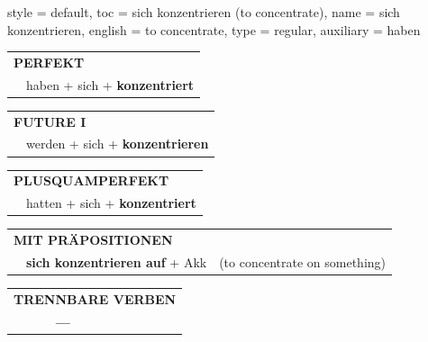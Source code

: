 \begin{verbentry}{
  style = {default},
  toc = {sich konzentrieren (to concentrate)},
  name = {sich konzentrieren},
  english = {to concentrate},
  type = {regular},
  auxiliary = {haben}
}
    \vspace{10pt}

 \begin{tabular}{rl}
     \multicolumn{2}{l}{\textbf{PERFEKT}}\\
    &haben + sich + \textbf{konzentriert}\\
  \end{tabular}
\hfill
   \begin{tabular}{rl}
   
    \multicolumn{2}{l}{\textbf{FUTURE I} }\\
    &werden + sich + \textbf{konzentrieren}\\
 
  \end{tabular}
\hfill
   \begin{tabular}{rl}
      \multicolumn{2}{l}{\textbf{PLUSQUAMPERFEKT}}\\
    &hatten + sich + \textbf{konzentriert}\\
  \end{tabular}
  
\vspace{10pt}

   \begin{tabular}{lll}
      \multicolumn{3}{l}{\textbf{MIT PRÄPOSITIONEN}}\\
& \textbf{sich konzentrieren auf} + Akk & (to concentrate on something)
  \end{tabular}
  \hfill
   \begin{tabular}{lll}
\multicolumn{3}{l}{\textbf{TRENNBARE VERBEN}}\\
& \textbf{---} & \\
\end{tabular}
  
  \vspace{-5pt}
\end{verbentry}

